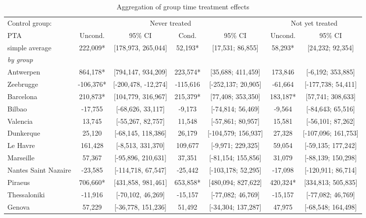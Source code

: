 \begin{table}[ht]
\centering
\caption{Aggregation of group time treatment effects} 
\begingroup\begin{adjustbox}{max width=\textwidth}
\begin{tabular}{lcccccc}
  \hline
\hline
Control group: & \multicolumn{4}{c}{Never treated} & \multicolumn{2}{c}{Not yet treated} \\
 \cmidrule(lr){2-5} \cmidrule(lr){6-7}  PTA & Uncond. & 95\% CI & Cond. & 95\% CI & Uncond. & 95\% CI  \\ 
  \hline
simple average &  222,009* & [178,973, 265,044] &   52,193* & [17,531; 86,855] &  58,293* & [24,232; 92,354] \\ 
   [1ex]\emph{by group} &  &  &  &  &  &  \\ 
   \hline
Antwerpen &  864,178* & [794,147, 934,209] &  223,574* & [35,688; 411,459] & 173,846 & [-6,192; 353,885] \\ 
  Zeebrugge & -106,376* & [-200,478, -12,274] & -115,616 & [-252,137; 20,905] & -61,664 & [-177,738; 54,411] \\ 
  Barcelona &  210,873* & [104,779, 316,967] &  215,379* & [77,408; 353,350] & 183,187* & [57,741; 308,633] \\ 
  Bilbao &  -17,755 & [-68,626, 33,117] &   -9,173 & [-74,814; 56,469] &  -9,564 & [-84,643; 65,516] \\ 
  Valencia &   13,745 & [-55,267, 82,757] &   11,548 & [-57,861; 80,957] &  15,581 & [-56,101; 87,262] \\ 
  Dunkerque &   25,120 & [-68,145, 118,386] &   26,179 & [-104,579; 156,937] &  27,328 & [-107,096; 161,753] \\ 
  Le Havre &  161,428 & [-8,513, 331,370] &  109,677 & [-9,971; 229,325] &  59,054 & [-59,135; 177,242] \\ 
  Marseille &   57,367 & [-95,896, 210,631] &   37,351 & [-81,154; 155,856] &  31,079 & [-88,139; 150,298] \\ 
  Nantes Saint Nazaire &  -23,585 & [-114,718, 67,547] &  -25,442 & [-103,178; 52,295] & -17,098 & [-120,911; 86,714] \\ 
  Piraeus &  706,660* & [431,858, 981,461] &  653,858* & [480,094; 827,622] & 420,324* & [334,813; 505,835] \\ 
  Thessaloniki &  -11,916 & [-70,102, 46,269] &  -15,157 & [-77,082; 46,769] & -15,157 & [-77,082; 46,769] \\ 
  Genova &   57,229 & [-36,778, 151,236] &   51,492 & [-34,304; 137,287] &  47,975 & [-68,548; 164,498] \\ 

\end{tabular}
\end{adjustbox}
\end{table}
